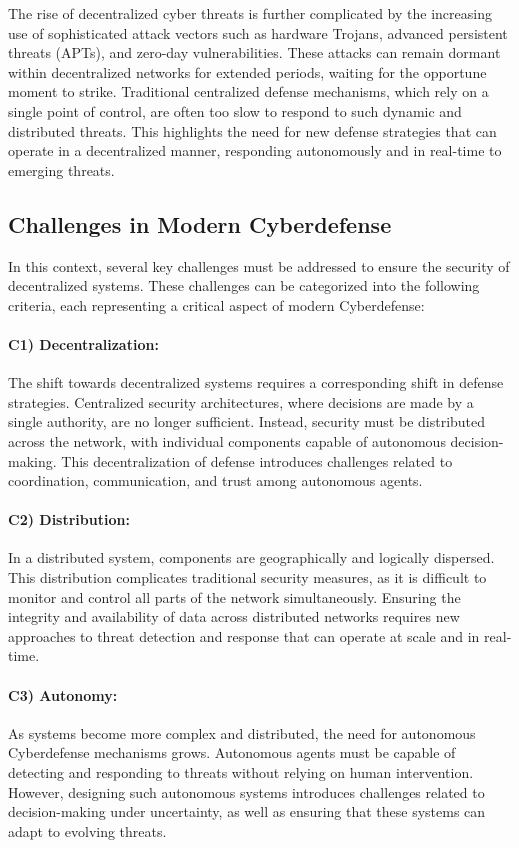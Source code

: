 The rise of decentralized cyber threats is further complicated by the increasing use of sophisticated attack vectors such as hardware Trojans, advanced persistent threats (APTs), and zero-day vulnerabilities. These attacks can remain dormant within decentralized networks for extended periods, waiting for the opportune moment to strike. Traditional centralized defense mechanisms, which rely on a single point of control, are often too slow to respond to such dynamic and distributed threats. This highlights the need for new defense strategies that can operate in a decentralized manner, responding autonomously and in real-time to emerging threats.

\subsection{Challenges in Modern Cyberdefense}

In this context, several key challenges must be addressed to ensure the security of decentralized systems. These challenges can be categorized into the following criteria, each representing a critical aspect of modern Cyberdefense:

\paragraph{C1) Decentralization:}
The shift towards decentralized systems requires a corresponding shift in defense strategies. Centralized security architectures, where decisions are made by a single authority, are no longer sufficient. Instead, security must be distributed across the network, with individual components capable of autonomous decision-making. This decentralization of defense introduces challenges related to coordination, communication, and trust among autonomous agents.

\paragraph{C2) Distribution:}
In a distributed system, components are geographically and logically dispersed. This distribution complicates traditional security measures, as it is difficult to monitor and control all parts of the network simultaneously. Ensuring the integrity and availability of data across distributed networks requires new approaches to threat detection and response that can operate at scale and in real-time.

\paragraph{C3) Autonomy:}
As systems become more complex and distributed, the need for autonomous Cyberdefense mechanisms grows. Autonomous agents must be capable of detecting and responding to threats without relying on human intervention. However, designing such autonomous systems introduces challenges related to decision-making under uncertainty, as well as ensuring that these systems can adapt to evolving threats.

